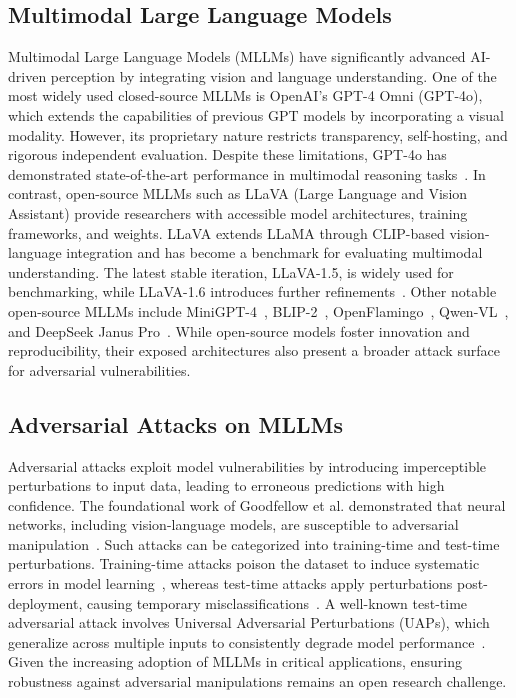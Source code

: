 \documentclass[runningheads]{llncs}
\begin{document}
\subsection{Multimodal Large Language Models}
Multimodal Large Language Models (MLLMs) have significantly advanced AI-driven perception by integrating vision and language understanding. One of the most widely used closed-source MLLMs is OpenAI’s GPT-4 Omni (GPT-4o), which extends the capabilities of previous GPT models by incorporating a visual modality. However, its proprietary nature restricts transparency, self-hosting, and rigorous independent evaluation. Despite these limitations, GPT-4o has demonstrated state-of-the-art performance in multimodal reasoning tasks~\cite{shahriar2024putting}. In contrast, open-source MLLMs such as LLaVA (Large Language and Vision Assistant) provide researchers with accessible model architectures, training frameworks, and weights. LLaVA extends LLaMA through CLIP-based vision-language integration and has become a benchmark for evaluating multimodal understanding. The latest stable iteration, LLaVA-1.5, is widely used for benchmarking, while LLaVA-1.6 introduces further refinements~\cite{liu2024visual}. Other notable open-source MLLMs include MiniGPT-4~\cite{zhu2023minigpt}, BLIP-2~\cite{li2023blip}, OpenFlamingo~\cite{awadalla2023openflamingo}, Qwen-VL~\cite{bai2023qwenvl}, and DeepSeek Janus Pro~\cite{chen2025janus}. While open-source models foster innovation and reproducibility, their exposed architectures also present a broader attack surface for adversarial vulnerabilities.

\subsection{Adversarial Attacks on MLLMs}
Adversarial attacks exploit model vulnerabilities by introducing imperceptible perturbations to input data, leading to erroneous predictions with high confidence. The foundational work of Goodfellow et al. demonstrated that neural networks, including vision-language models, are susceptible to adversarial manipulation~\cite{goodfellow2014explaining, papernot2016limitations,mkadry2017towards}. Such attacks can be categorized into training-time and test-time perturbations. Training-time attacks poison the dataset to induce systematic errors in model learning~\cite{wan2023poisoning}, whereas test-time attacks apply perturbations post-deployment, causing temporary misclassifications~\cite{chakraborty2021survey}. A well-known test-time adversarial attack involves Universal Adversarial Perturbations (UAPs), which generalize across multiple inputs to consistently degrade model performance~\cite{moosavidezfooli2017universaladversarialperturbations,lu2024test}. Given the increasing adoption of MLLMs in critical applications, ensuring robustness against adversarial manipulations remains an open research challenge.
\end{document}
